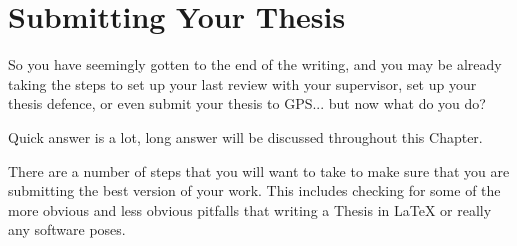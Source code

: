 \chapter{Submitting Your Thesis}
	So you have seemingly gotten to the end of the writing, and you may be already taking the steps to set up your last review with your supervisor, set up your thesis defence, or even submit your thesis to GPS... but now what do you do?
	
	Quick answer is a lot, long answer will be discussed throughout this Chapter.
	
	There are a number of steps that you will want to take to make sure that you are submitting the best version of your work.
	This includes checking for some of the more obvious and less obvious pitfalls that writing a Thesis in \LaTeX{} or really any software poses.